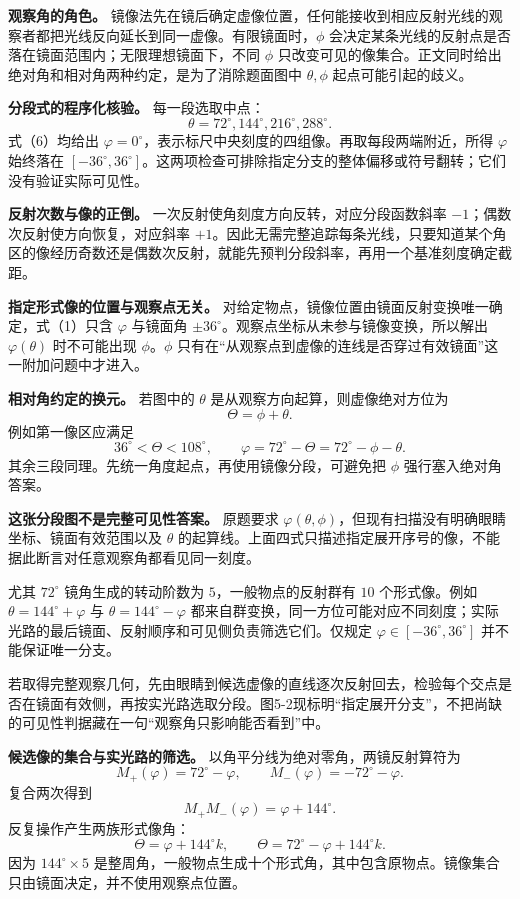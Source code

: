 \documentclass[12pt,a4paper,UTF8]{ctexart}
\begin{document}
\textbf{观察角的角色。}
镜像法先在镜后确定虚像位置，任何能接收到相应反射光线的观察者都把光线反向延长到同一虚像。有限镜面时，\(\phi\)
会决定某条光线的反射点是否落在镜面范围内；无限理想镜面下，不同 \(\phi\)
只改变可见的像集合。正文同时给出绝对角和相对角两种约定，是为了消除题面图中
\(\theta,\phi\) 起点可能引起的歧义。

\textbf{分段式的程序化核验。} 每一段选取中点： \[
\theta=72^\circ,144^\circ,216^\circ,288^\circ.
\] 式（6）均给出
\(\varphi=0^\circ\)，表示标尺中央刻度的四组像。再取每段两端附近，所得
\(\varphi\) 始终落在
\([-36^\circ,36^\circ]\)。这两项检查可排除指定分支的整体偏移或符号翻转；它们没有验证实际可见性。

\textbf{反射次数与像的正倒。} 一次反射使角刻度方向反转，对应分段函数斜率
\(-1\)；偶数次反射使方向恢复，对应斜率
\(+1\)。因此无需完整追踪每条光线，只要知道某个角区的像经历奇数还是偶数次反射，就能先预判分段斜率，再用一个基准刻度确定截距。

\textbf{指定形式像的位置与观察点无关。}
对给定物点，镜像位置由镜面反射变换唯一确定，式（1）只含 \(\varphi\)
与镜面角 \(\pm36^\circ\)。观察点坐标从未参与镜像变换，所以解出
\(\varphi(\theta)\) 时不可能出现 \(\phi\)。\(\phi\)
只有在``从观察点到虚像的连线是否穿过有效镜面''这一附加问题中才进入。

\textbf{相对角约定的换元。} 若图中的 \(\theta\)
是从观察方向起算，则虚像绝对方位为 \[
\Theta=\phi+\theta.
\] 例如第一像区应满足 \[
36^\circ<\Theta<108^\circ,\qquad
\varphi=72^\circ-\Theta
=72^\circ-\phi-\theta.
\] 其余三段同理。先统一角度起点，再使用镜像分段，可避免把 \(\phi\)
强行塞入绝对角答案。

\textbf{这张分段图不是完整可见性答案。} 原题要求
\(\varphi(\theta,\phi)\)，但现有扫描没有明确眼睛坐标、镜面有效范围以及
\(\theta\)
的起算线。上面四式只描述指定展开序号的像，不能据此断言对任意观察角都看见同一刻度。

尤其 \(72^\circ\) 镜角生成的转动阶数为 \(5\)，一般物点的反射群有 \(10\)
个形式像。例如 \(\theta=144^\circ+\varphi\) 与
\(\theta=144^\circ-\varphi\)
都来自群变换，同一方位可能对应不同刻度；实际光路的最后镜面、反射顺序和可见侧负责筛选它们。仅规定
\(\varphi\in[-36^\circ,36^\circ]\) 并不能保证唯一分支。

若取得完整观察几何，先由眼睛到候选虚像的直线逐次反射回去，检验每个交点是否在镜面有效侧，再按实光路选取分段。图5-2现标明``指定展开分支''，不把尚缺的可见性判据藏在一句``观察角只影响能否看到''中。

\textbf{候选像的集合与实光路的筛选。}
以角平分线为绝对零角，两镜反射算符为 \[
M_+(\varphi)=72^\circ-\varphi,\qquad
M_-(\varphi)=-72^\circ-\varphi.
\] 复合两次得到 \[
M_+M_-(\varphi)=\varphi+144^\circ.
\] 反复操作产生两族形式像角： \[
\Theta=\varphi+144^\circ k,
\qquad
\Theta=72^\circ-\varphi+144^\circ k.
\] 因为 \(144^\circ\times5\)
是整周角，一般物点生成十个形式角，其中包含原物点。镜像集合只由镜面决定，并不使用观察点位置。
\end{document}
